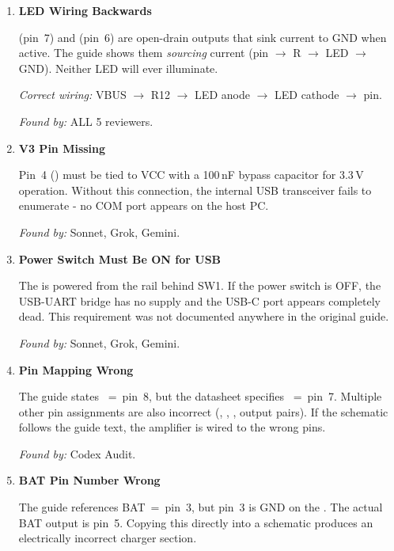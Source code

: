 \begin{enumerate}[leftmargin=2em, itemsep=8pt]

  \item \textbf{ LED Wiring Backwards}

   (pin~7) and  (pin~6) are open-drain outputs that sink
  current to GND when active.  The guide shows them \emph{sourcing} current
  (pin $\to$ R $\to$ LED $\to$ GND).  Neither LED will ever illuminate.

  \textit{Correct wiring:}
  VBUS $\to$ R12 $\to$ LED anode $\to$ LED cathode $\to$  pin.

  \textit{Found by:} ALL 5 reviewers.

  \item \textbf{ V3 Pin Missing}

  Pin~4 () must be tied to VCC with a 100\,nF bypass capacitor for
  3.3\,V operation.  Without this connection, the internal USB transceiver
  fails to enumerate - no COM port appears on the host PC.

  \textit{Found by:} Sonnet, Grok, Gemini.

  \item \textbf{Power Switch Must Be ON for USB}

  The  is powered from the  rail behind SW1.  If the
  power switch is OFF, the USB-UART bridge has no supply and the USB-C port
  appears completely dead.  This requirement was not documented anywhere in the
  original guide.

  \textit{Found by:} Sonnet, Grok, Gemini.

  \item \textbf{ Pin Mapping Wrong}

  The guide states ~=~pin~8, but the  datasheet
  specifies ~=~pin~7.  Multiple other pin assignments are also
  incorrect (, , , output pairs).  If the
  schematic follows the guide text, the amplifier is wired to the wrong pins.

  \textit{Found by:} Codex Audit.

  \item \textbf{ BAT Pin Number Wrong}

  The guide references BAT~=~pin~3, but pin~3 is GND on the .
  The actual BAT output is pin~5.  Copying this directly into a schematic
  produces an electrically incorrect charger section.


\end{enumerate}

